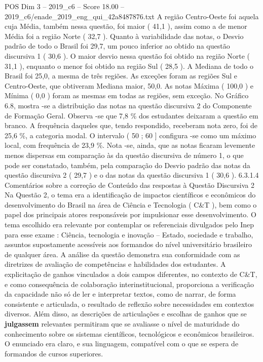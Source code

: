 \begin{textsample}{POS Dim 3 – 2019\_c6 – Score 18.00 – 2019\_c6/enade\_2019\_eng\_qui\_42a8487876.txt}
A região Centro-Oeste foi aquela cuja Média, também nessa questão, foi maior ( 41,1 ), assim como a de menor Média foi a região Norte ( 32,7 ).
Quanto à variabilidade das notas, o Desvio padrão de todo o Brasil foi 29,7, um pouco inferior ao obtido na questão discursiva 1 ( 30,6 ).
O maior desvio nessa questão foi obtido na região Norte ( 31,1 ), enquanto o menor foi obtido na região Sul ( 28,5 ).
A Mediana de todo o Brasil foi 25,0, a mesma de três regiões.
As exceções foram as regiões Sul e Centro-Oeste, que obtiveram Mediana maior, 50,0.
As notas Máxima ( 100,0 ) e Mínima ( 0,0 ) foram as mesmas em todas as regiões, sem exceção.
No Gráfico 6.8, mostra -se a distribuição das notas na questão discursiva 2 do Componente de Formação Geral.
Observa -se que 7,8 \% dos estudantes deixaram a questão em branco.
A frequência daqueles que, tendo respondido, receberam nota zero, foi de 25,6 \%, a categoria modal.
O intervalo ( 50 ; 60 ] configura -se como um máximo local, com frequência de 23,9 \%.
Nota -se, ainda, que as notas ficaram levemente menos dispersas em comparação às da questão discursiva de número 1, o que pode ser constatado, também, pela comparação do Desvio padrão das notas da questão discursiva 2 ( 29,7 ) e o das notas da questão discursiva 1 ( 30,6 ). 6.3.1.4 Comentários sobre a correção de Conteúdo das respostas à Questão Discursiva 2 Na Questão 2, o tema era a identificação de impactos científicos e econômicos do desenvolvimento do Brasil na área de Ciência e Tecnologia ( C\&T ), bem como o papel dos principais atores responsáveis por impulsionar esse desenvolvimento.
O tema escolhido era relevante por contemplar os referenciais divulgados pelo Inep para esse exame : Ciência, tecnologia e inovação – Estado, sociedade e trabalho, assuntos supostamente acessíveis aos formandos do nível universitário brasileiro de qualquer área.
A análise da questão demonstra sua conformidade com as diretrizes de avaliação de competências e habilidades dos estudantes.
A explicitação de ganhos vinculados a dois campos diferentes, no contexto de C\&T, e como consequência de colaboração interinstitucional, proporciona a verificação da capacidade não só de ler e interpretar textos, como de narrar, de forma consistente e articulada, o resultado de reflexão sobre necessidades em contextos diversos.
Além disso, as descrições de articulações e escolhas de ganhos que se \textbf{julgassem} relevantes permitiram que se avaliasse o nível de maturidade do conhecimento sobre os sistemas científicos, tecnológicos e econômicos brasileiros.
O enunciado era claro, e sua linguagem, compatível com o que se espera de formandos de cursos superiores.

\end{textsample}
